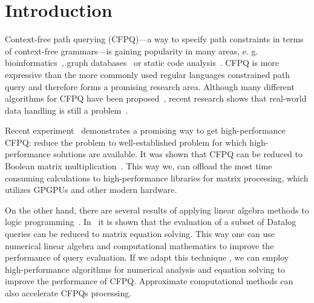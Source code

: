 \documentclass[sigconf, 10pt]{acmart}
\begin{document}



\maketitle

\section{Introduction}

Context-free path querying (CFPQ)---a way to specify path constraints in terms of context-free grammars---is gaining popularity in many areas, e. g. bioinformatics~\cite{sevon2008subgraph}, graph databases~\cite{yannakakis1990graph,Medeiros:2018:EEC:3167132.3167265,Kuijpers:2019:ESC:3335783.3335791} or static code analysis~\cite{Reps,zhang2013fast}.
CFPQ is more expressive than the more commonly used regular languages constrained path query and therefore forms a promising research area.
Although many different algorithms for CFPQ have been proposed~\cite{RDF,Medeiros:2018:EEC:3167132.3167265,azimov2018context,Verbitskaia:2018:PCC:3241653.3241655,10.1007/978-3-319-91662-0_17}, recent research shows that real-world data handling is still a problem~\cite{Kuijpers:2019:ESC:3335783.3335791}.

Recent experiment~\cite{mishin2019evaluation} demonstrates a promising way to get high-performance CFPQ: reduce the problem to well-established problem for which high-performance solutions are available.
It was shown that CFPQ can be reduced to Boolean matrix multiplication~\cite{azimov2018context}.
This way we, can offload the most time consuming calculations to high-performance libraries for matrix processing, which utilizes GPGPUs and other modern hardware.

On the other hand, there are several results of applying linear algebra methods
to logic programming~\cite{sato2017linear, aspis2018linear}.
In~\cite{sato2017linear} it is shown that the evaluation of a subset of Datalog queries can be reduced to matrix equation solving.
This way one can use numerical linear algebra and computational mathematics to improve the performance of query evaluation.
If we adapt this technique 
, we can employ high-performance algorithms for numerical analysis and equation solving to improve the performance of CFPQ.
Approximate computational methods can also accelerate CFPQs processing.
\end{document}
